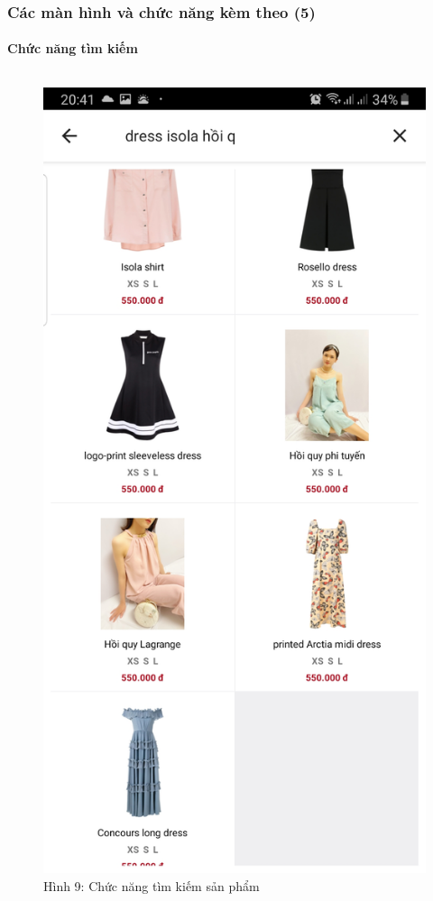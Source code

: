 \documentclass{beamer}
\begin{document}
\begin{frame}
    \frametitle{Các màn hình và chức năng kèm theo (5)}
    \framesubtitle{Chức năng tìm kiếm}

    \begin{columns}
        \begin{figure}
            \centering
            \includegraphics[height=0.7\textheight]{images/09.png}
            \caption{\centering\tiny{Hình 9: Chức năng tìm kiếm sản phẩm}}


\end{figure}
\end{columns}
\end{frame}
\end{document}
